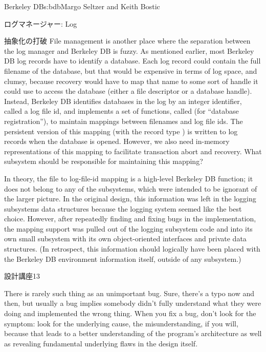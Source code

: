 \begin{aosachapter}{Berkeley DB}{s:bdb}{Margo Seltzer and Keith Bostic}
\begin{aosasect1}{ログマネージャー: Log}
\begin{aosasect2}{抽象化の打破}
File management is another place where the separation between the log
manager and Berkeley DB is fuzzy. As mentioned earlier, most Berkeley
DB log records have to identify a database. Each log record could
contain the full filename of the database, but that would be
expensive in terms of log space, and clumsy, because recovery would
have to map that name to some sort of handle it could use to access
the database (either a file descriptor or a database handle). Instead,
Berkeley DB identifies databases in the log by an integer identifier,
called a log file id, and implements a set of functions, called
 (for ``database registration''), to maintain mappings
between filenames and log file ids. The persistent version of this
mapping (with the record type )
is written to log records when the database is opened.  However, we also need
in-memory representations of this mapping to facilitate transaction
abort and recovery. What subsystem should be responsible for
maintaining this mapping?

In theory, the file to log-file-id mapping is a high-level Berkeley DB
function; it does not belong to any of the subsystems, which were
intended to be ignorant of the larger picture. In the original design,
this information was left in the logging subsystems data structures
because the logging system seemed like the best choice. However, after
repeatedly finding and fixing bugs in the implementation, the mapping
support was pulled out of the logging subsystem code and into its own
small subsystem with its own object-oriented interfaces and private
data structures.  (In retrospect, this information should logically
have been placed with the Berkeley DB environment information itself,
outside of any subsystem.) 

\begin{aosabox}{設計講座13}

There is rarely such thing as an unimportant bug. Sure, there's a typo
now and then, but usually a bug implies somebody didn't fully
understand what they were doing and implemented the wrong thing.
When you fix a bug, don't look for the symptom: look for the
underlying cause, the misunderstanding, if you will, because that
leads to a better understanding of the program's architecture as well
as revealing fundamental underlying flaws in the design itself.

\end{aosabox}


\end{aosasect2}
\end{aosasect1}
\end{aosachapter}
